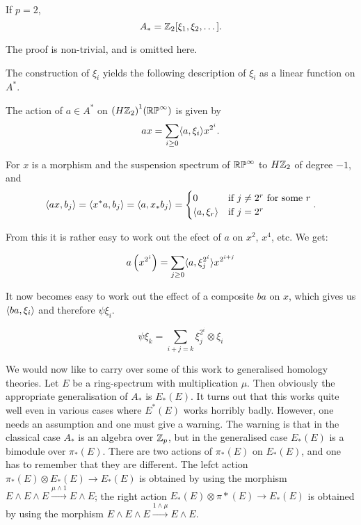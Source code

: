 \documentclass[../main]{subfiles}
\begin{document}
\begin{theorem} \label{thm:p3ch12.1}
If $p=2$,
\[ A_\ast=\mathbb{Z}_2[\xi_1,\xi_2,\dots] . \]
\end{theorem}

The proof is non-trivial, and is omitted here.

The construction of $\xi_i$ yields the following description of $\xi_i$ as a linear function on $A^\ast$.

\begin{proposition} \label{prop:p3ch12.2}
The action of $a\in A^\ast$ on ${(H\mathbb{Z}_2)}^1(\mathbb{RP}^\infty)$ is given by
\[ ax = \sum_{i\geq0}\langle a,\xi_i\rangle x^{2^i} . \]

\end{proposition}

For $x$ is a morphism and the suspension spectrum of $\mathbb{RP}^\infty$ to $H\mathbb{Z}_2$ of degree $-1$, and
\[ \langle ax,b_j\rangle = \langle x^\ast a,b_j\rangle = \langle a,x_\ast b_j\rangle = \begin{cases} 0 & \text{if $j\neq 2^r$ for some $r$} \\ \langle a,\xi_r\rangle & \text{if } j=2^r \end{cases} . \]

From this it is rather easy to work out the efect of $a$ on $x^2$, $x^4$, etc. We get:

\begin{proposition} \label{prop:p3ch12.3}
\[ a\left(x^{2^i}\right) = \sum_{j\geq0}\langle a,\xi_j^{2^i}\rangle x^{2^{i+j}} \]
\end{proposition}

It now becomes easy to work out the effect of a composite $ba$ on $x$, which gives us $\langle ba,\xi_i\rangle$ and therefore $\psi\xi_i$.

\begin{proposition} \label{prop:p3ch12.4}
\[ \psi\xi_k = \sum_{i+j=k}\xi_j^{2^i}\otimes\xi_i \]
\end{proposition}

We would now like to carry over some of this work to generalised homology theories. Let $E$ be a ring-spectrum with multiplication $\mu$. Then obviously the appropriate generalisation of $A_\ast$ is $E_\ast(E)$. It turns out that this works quite well even in various cases where $E^\ast(E)$ works horribly badly. However, one needs an assumption and one must give a warning. The warning is that in the classical case $A_\ast$ is an algebra over $\mathbb{Z}_p$, but in the generalised case $E_\ast(E)$ is a bimodule over $\pi_\ast(E)$. There are two actions of $\pi_\ast(E)$ on $E_\ast(E)$, and one has to remember that they are different. The lefct action $\pi_\ast(E)\otimes E_\ast(E)\longrightarrow E_\ast(E)$ is obtained by using the morphism $E\wedge E\wedge E\overset{\mu\wedge1}\longrightarrow E\wedge E$; the right action $E_\ast(E)\otimes\pi\ast(E)\longrightarrow E_\ast(E)$ is obtained by using the morphism $E\wedge E\wedge E\overset{1\wedge\mu}\longrightarrow E\wedge E$.
\end{document}
